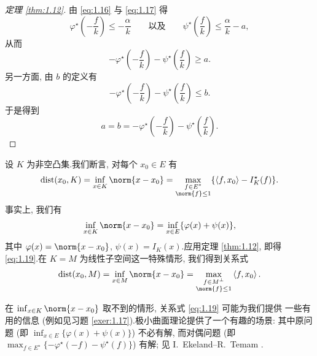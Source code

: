 \begin{proof}[定理 \ref{thm:1.12}]
由 \eqref{eq:1.16} 与 \eqref{eq:1.17} 得
\begin{equation*}
\varphi^\star\!\left(-\frac{f}{k}\right)\le-\frac{\alpha}{k}
\qquad\text{以及}\qquad
\psi^\star\!\left(\frac{f}{k}\right)\le\frac{\alpha}{k}-a,
\end{equation*}
从而
\begin{equation*}
-\varphi^\star\!\left(-\frac{f}{k}\right)-\psi^\star\!\left(\frac{f}{k}\right)\ge a.
\end{equation*}
另一方面, 由 $b$ 的定义有
\begin{equation*}
-\varphi^\star\!\left(-\frac{f}{k}\right)-\psi^\star\!\left(\frac{f}{k}\right)\le b.
\end{equation*}
于是得到
\begin{equation*}
a=b=-\varphi^\star\!\left(-\frac{f}{k}\right)-\psi^\star\!\left(\frac{f}{k}\right).
\end{equation*}
\end{proof}

\begin{example}
设 $K$ 为非空凸集.我们断言, 对每个 $x_0\in E$ 有
\begin{equation}
\dist(x_0,K)=\inf_{x\in K}\norm{x-x_0}
=\max_{\substack{f\in E^\star\\ \norm{f}\le 1}}\{\dual{f}{x_0}-I_K^\star(f)\}.
  \label{eq:1.19}
\end{equation}
事实上, 我们有
\begin{equation*}
\inf_{x\in K}\norm{x-x_0}=\inf_{x\in E}\{\varphi(x)+\psi(x)\},
\end{equation*}
其中 $\varphi(x)=\norm{x-x_0}$, $\psi(x)=I_K(x)$.应用定理  \ref{thm:1.12}, 即得
\eqref{eq:1.19}.在 $K=M$ 为线性子空间这一特殊情形, 我们得到关系式
\begin{equation*}
\dist(x_0,M)=\inf_{x\in M}\norm{x-x_0}
=\max_{\substack{f\in M^\perp\\ \norm{f}\le 1}}\dual{f}{x_0}.
\end{equation*}
\end{example}

\begin{remark}
\label{rem:1.8}
在 $\inf_{x\in K}\norm{x-x_0}$ 取不到的情形, 关系式 \eqref{eq:1.19} 可能为我们提供
一些有用的信息 (例如见习题  \ref{exer:1.17}).极小曲面理论提供了一个有趣的场景:
其中原问题 (即 $\inf_{x\in E}\{\varphi(x)+\psi(x)\}$) 不必有解, 而对偶问题
(即 $\max_{f\in E^\star}\{-\varphi^\star(-f)-\psi^\star(f)\}$) 有解; 见
I.~Ekeland--R.~Temam .
\end{remark}

